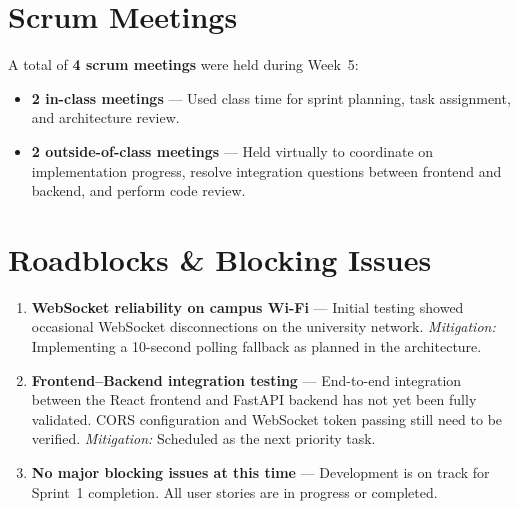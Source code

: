\documentclass[11pt]{article}
\begin{document}
\section{Scrum Meetings}

A total of \textbf{4 scrum meetings} were held during Week~5:

\begin{itemize}[leftmargin=1.5em]
    \item \textbf{2 in-class meetings} --- Used class time for sprint planning, task assignment, and architecture review.
    \item \textbf{2 outside-of-class meetings} --- Held virtually to coordinate on implementation progress, resolve integration questions between frontend and backend, and perform code review.
\end{itemize}

\section{Roadblocks \& Blocking Issues}

\begin{enumerate}[leftmargin=1.5em]
    \item \textbf{WebSocket reliability on campus Wi-Fi} --- Initial testing showed occasional WebSocket disconnections on the university network. \textit{Mitigation:} Implementing a 10-second polling fallback as planned in the architecture.

    \item \textbf{Frontend--Backend integration testing} --- End-to-end integration between the React frontend and FastAPI backend has not yet been fully validated. CORS configuration and WebSocket token passing still need to be verified. \textit{Mitigation:} Scheduled as the next priority task.

    \item \textbf{No major blocking issues at this time} --- Development is on track for Sprint~1 completion. All user stories are in progress or completed.
\end{enumerate}
\end{document}
